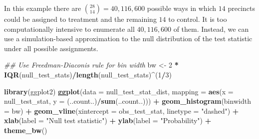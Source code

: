 \documentclass[
  12pt,
  leqno]{article}
\newenvironment{Shaded}{\begin{snugshade}}{\end{snugshade}}
\newcommand{\CommentTok}[1]{\textcolor[rgb]{0.56,0.35,0.01}{\textit{#1}}}
\newcommand{\DataTypeTok}[1]{\textcolor[rgb]{0.13,0.29,0.53}{#1}}
\newcommand{\DecValTok}[1]{\textcolor[rgb]{0.00,0.00,0.81}{#1}}
\newcommand{\KeywordTok}[1]{\textcolor[rgb]{0.13,0.29,0.53}{\textbf{#1}}}
\newcommand{\NormalTok}[1]{#1}
\newcommand{\OperatorTok}[1]{\textcolor[rgb]{0.81,0.36,0.00}{\textbf{#1}}}
\newcommand{\StringTok}[1]{\textcolor[rgb]{0.31,0.60,0.02}{#1}}
\begin{document}
\normalsize

In this example there are \(\binom{28}{14} = 40,116,600\) possible ways
in which \(14\) precincts could be assigned to treatment and the
remaining \(14\) to control. It is too computationally intensive to
enumerate all \(40,116,600\) of them. Instead, we can use a
simulation-based approximation to the null distribution of the test
statistic under all possible assignments.

\scriptsize

\begin{Shaded}
\end{Shaded}

\normalsize

\scriptsize

\begin{Shaded}
\begin{Highlighting}[]
\CommentTok{\#\# Use Freedman{-}Diaconis rule for bin width}
\NormalTok{bw \textless{}{-}}\StringTok{ }\DecValTok{2} \OperatorTok{*}\StringTok{ }\KeywordTok{IQR}\NormalTok{(null\_test\_stats)}\OperatorTok{/}\KeywordTok{length}\NormalTok{(null\_test\_stats)}\OperatorTok{\^{}}\NormalTok{(}\DecValTok{1}\OperatorTok{/}\DecValTok{3}\NormalTok{)}

\KeywordTok{library}\NormalTok{(ggplot2)}
\KeywordTok{ggplot}\NormalTok{(}\DataTypeTok{data =}\NormalTok{ null\_test\_stat\_dist, }\DataTypeTok{mapping =} \KeywordTok{aes}\NormalTok{(}\DataTypeTok{x =}\NormalTok{ null\_test\_stat, }\DataTypeTok{y =}\NormalTok{ (..count..)}\OperatorTok{/}\KeywordTok{sum}\NormalTok{(..count..))) }\OperatorTok{+}\StringTok{ }
\StringTok{    }\KeywordTok{geom\_histogram}\NormalTok{(}\DataTypeTok{binwidth =}\NormalTok{ bw) }\OperatorTok{+}\StringTok{ }\KeywordTok{geom\_vline}\NormalTok{(}\DataTypeTok{xintercept =}\NormalTok{ obs\_test\_stat, }\DataTypeTok{linetype =} \StringTok{"dashed"}\NormalTok{) }\OperatorTok{+}\StringTok{ }
\StringTok{    }\KeywordTok{xlab}\NormalTok{(}\DataTypeTok{label =} \StringTok{"Null test statistic"}\NormalTok{) }\OperatorTok{+}\StringTok{ }\KeywordTok{ylab}\NormalTok{(}\DataTypeTok{label =} \StringTok{"Probability"}\NormalTok{) }\OperatorTok{+}\StringTok{ }\KeywordTok{theme\_bw}\NormalTok{()}
\end{Highlighting}
\end{Shaded}
\end{document}
